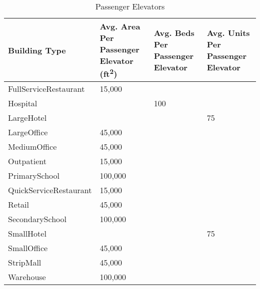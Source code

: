 \begin{table}
\small
\centering
\caption[Passenger Elevators]{Passenger Elevators}
\label{tab:passenger_elevators}
\begin{tabular}{|p{1.5in}|p{1in}|p{1in}|p{1in}|}
\hline
\textbf{Building Type}  & \textbf{Avg. Area Per Passenger Elevator (ft\textsuperscript{2})} & \textbf{Avg. Beds Per Passenger Elevator} & \textbf{Avg. Units Per Passenger Elevator} \\ \hline
FullServiceRestaurant  & 15,000    &     &     \\ \hline
Hospital               &           & 100 &     \\ \hline
LargeHotel             &           &     & 75  \\ \hline
LargeOffice            & 45,000    &     &     \\ \hline
MediumOffice           & 45,000    &     &     \\ \hline
Outpatient             & 15,000    &     &     \\ \hline
PrimarySchool          & 100,000   &     &     \\ \hline
QuickServiceRestaurant & 15,000    &     &     \\ \hline
Retail                 & 45,000    &     &     \\ \hline
SecondarySchool        & 100,000   &     &     \\ \hline
SmallHotel             &           &     & 75  \\ \hline
SmallOffice            & 45,000    &     &     \\ \hline
StripMall              & 45,000    &     &     \\ \hline
Warehouse              & 100,000   &     &     \\ \hline
\end{tabular}
\end{table}